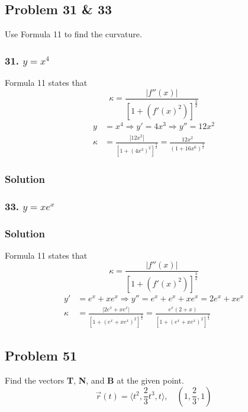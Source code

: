 \documentclass{article}
\newcommand{\rvec}{\vec{r}(t)}
\begin{document}
\subsection*{Problem 31 \& 33}

Use Formula 11 to find the curvature.

\subsubsection*{31. $y = x^4$}
Formula 11 states that 
\[
    \kappa = \frac{|f''(x)|}{[1 + (f'(x)^2)]^{\frac 3 2}}
\]
\begin{align*}
    y &= x^4 \Rightarrow y' = 4x^3 \Rightarrow y'' = 12x^2 \\
    \kappa &= \frac{|12x^2|}{[1+(4x^3)^2]^{\frac 3 2}} = \frac{12x^2}{(1+16x^6)^{\frac{3}{2}}}
\end{align*}
\subsubsection*{Solution}
    
\subsubsection*{33. $y = xe^x$}
\subsubsection*{Solution}
Formula 11 states that 
\[
    \kappa = \frac{|f''(x)|}{[1 + (f'(x)^2)]^{\frac 3 2}}
\]
\begin{align*}
    y' &= e^x + xe^x \Rightarrow y'' = e^x + e^x + xe^x = 2e^x + xe^x \\
    \kappa &= \frac {|2e^x + xe^x|} {[1+ (e^x + xe^x)^2]^{\frac 3 2}} = \frac {e^x(2 + x)} {[1+ (e^x + xe^x)^2]^{\frac 3 2}}
\end{align*}
\subsection*{Problem 51}
Find the vectors \textbf{T}, \textbf{N}, and \textbf{B} at the given point.
\[
    \rvec = \langle{t^2, \frac{2}{3}t^3, t}\rangle, \quad (1, \frac{2}{3}, 1)
\]
\end{document}
